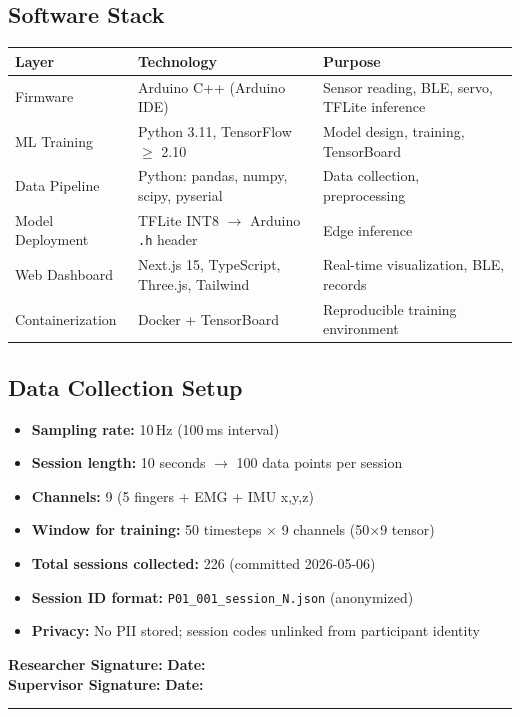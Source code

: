 \documentclass[12pt,a4paper]{article}
\newcommand{\sigblock}{%
  \vspace{0.6em}
  \noindent\textbf{Researcher Signature:} \underline{\hspace{6cm}} \quad \textbf{Date:} \underline{\hspace{3cm}}\\[0.4em]
  \noindent\textbf{Supervisor Signature:} \underline{\hspace{6cm}} \quad \textbf{Date:} \underline{\hspace{3cm}}
  \vspace{0.4em}\hrule\vspace{0.6em}
}
\begin{document}
\subsection{Software Stack}
\begin{center}
\begin{tabular}{@{}p{3.2cm} p{5.5cm} p{5.0cm}@{}}
\toprule
\textbf{Layer} & \textbf{Technology} & \textbf{Purpose} \\
\midrule
Firmware & Arduino C++ (Arduino IDE) & Sensor reading, BLE, servo, TFLite inference \\
ML Training & Python 3.11, TensorFlow $\geq$ 2.10 & Model design, training, TensorBoard \\
Data Pipeline & Python: pandas, numpy, scipy, pyserial & Data collection, preprocessing \\
Model Deployment & TFLite INT8 $\rightarrow$ Arduino \texttt{.h} header & Edge inference \\
Web Dashboard & Next.js 15, TypeScript, Three.js, Tailwind & Real-time visualization, BLE, records \\
Containerization & Docker + TensorBoard & Reproducible training environment \\
\bottomrule
\end{tabular}
\end{center}

\subsection{Data Collection Setup}
\begin{itemize}
  \item \textbf{Sampling rate:} 10\,Hz (100\,ms interval)
  \item \textbf{Session length:} 10 seconds $\rightarrow$ 100 data points per session
  \item \textbf{Channels:} 9 (5 fingers + EMG + IMU x,y,z)
  \item \textbf{Window for training:} 50 timesteps $\times$ 9 channels (50$\times$9 tensor)
  \item \textbf{Total sessions collected:} 226 (committed 2026-05-06)
  \item \textbf{Session ID format:} \texttt{P01\_001\_session\_N.json} (anonymized)
  \item \textbf{Privacy:} No PII stored; session codes unlinked from participant identity
\end{itemize}

\sigblock
\end{document}
